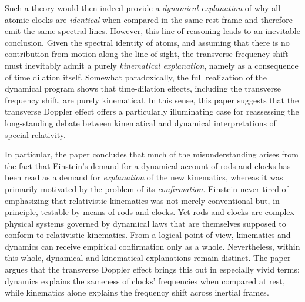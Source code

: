 \documentclass[submitted,12pt]{article} %
\newcommand{\tDe}{transverse Doppler effect\xspace}
\providecommand{\DIFadd}[1]{{\protect\color{blue}\uwave{#1}}} %
\providecommand{\DIFaddbegin}{} %
\providecommand{\DIFaddend}{} %
\begin{document}
Such a theory would then indeed provide a \emph{dynamical explanation} of why all atomic clocks are \emph{identical} when compared in the same rest frame and therefore emit the same spectral lines. However, this line of reasoning leads to an inevitable conclusion. Given the spectral identity of atoms, and assuming that there is no contribution from motion along the line of sight, the transverse frequency shift must inevitably admit a purely \emph{kinematical explanation}, namely as a consequence of time dilation itself. Somewhat paradoxically, the full realization of the dynamical program shows that time-dilation effects, including the transverse frequency shift, are purely kinematical. In this sense, this paper suggests that the \tDe offers a particularly illuminating case for reassessing the long-standing debate between kinematical and dynamical interpretations of special relativity. 

In particular, the paper concludes that much of the misunderstanding arises from the fact that Einstein’s demand for a dynamical account of rods and clocks has been read as a demand for \DIFaddbegin \DIFadd{an }\DIFaddend \emph{explanation} of the new kinematics, whereas it was primarily motivated by the problem of its \emph{confirmation}. Einstein never tired of emphasizing that relativistic kinematics was not merely conventional but, in principle, testable by means of rods and clocks. Yet rods and clocks are complex physical systems governed by dynamical laws that are themselves supposed to conform to relativistic kinematics. From a logical point of view, kinematics and dynamics can receive empirical confirmation only as a whole. Nevertheless, within this whole, dynamical and kinematical explanations remain distinct. The paper argues that the \tDe brings this out in especially vivid terms: dynamics explains the sameness of clocks’ frequencies when compared at rest, while kinematics alone explains the frequency shift across inertial frames.
\end{document}
